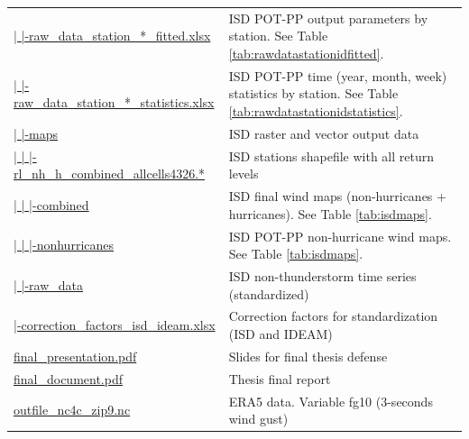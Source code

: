 \documentclass[12pt,oneside]{reedthesis}
\begin{document}
\begin{longtable}[t]{>{\raggedright\arraybackslash}p{2.2in}>{\raggedright\arraybackslash}p{4in}}
\href{ftp://ftp.geocorp.co/windthesis/potpp/isd/}{  |    |-raw\_data\_station\_*\_fitted.xlsx} & ISD POT-PP output parameters by station. See Table \ref{tab:rawdatastationidfitted}.\\
\href{ftp://ftp.geocorp.co/windthesis/potpp/isd/}{  |    |-raw\_data\_station\_*\_statistics.xlsx} & ISD POT-PP time (year, month, week) statistics by station. See Table \ref{tab:rawdatastationidstatistics}.\\
\href{ftp://ftp.geocorp.co/windthesis/potpp/isd/maps/}{  |    |-maps} & ISD raster and vector output data\\
\href{ftp://ftp.geocorp.co/windthesis/potpp/isd/maps/}{  |    |    |-rl\_nh\_h\_combined\_allcells4326.*} & ISD stations shapefile with all return levels\\
\href{ftp://ftp.geocorp.co/windthesis/potpp/isd/maps/combined/}{  |    |    |-combined} & ISD final wind maps (non-hurricanes + hurricanes). See Table \ref{tab:isdmaps}.\\
\href{ftp://ftp.geocorp.co/windthesis/potpp/isd/maps/nonhurricanes/}{  |    |    |-nonhurricanes} & ISD POT-PP non-hurricane wind maps. See Table \ref{tab:isdmaps}.\\
\href{ftp://ftp.geocorp.co/windthesis/potpp/isd/raw_data/}{  |    |-raw\_data} & ISD non-thunderstorm time series (standardized)\\
\href{ftp://ftp.geocorp.co/windthesis/potpp/correction_factors_isd_ideam.xlsx}{  |-correction\_factors\_isd\_ideam.xlsx} & Correction factors for standardization (ISD and IDEAM)\\
\href{ftp://ftp.geocorp.co/windthesis/final_presentation.pdf}{final\_presentation.pdf} & Slides for final thesis defense\\
\href{ftp://ftp.geocorp.co/windthesis/final_document.pdf}{final\_document.pdf} & Thesis final report\\
\href{ftp://ftp.geocorp.co/windthesis/outfile_nc4c_zip9.nc}{outfile\_nc4c\_zip9.nc} & ERA5 data. Variable fg10 (3-seconds wind gust)\\
\bottomrule
\end{longtable}
\endgroup{}
\end{document}
